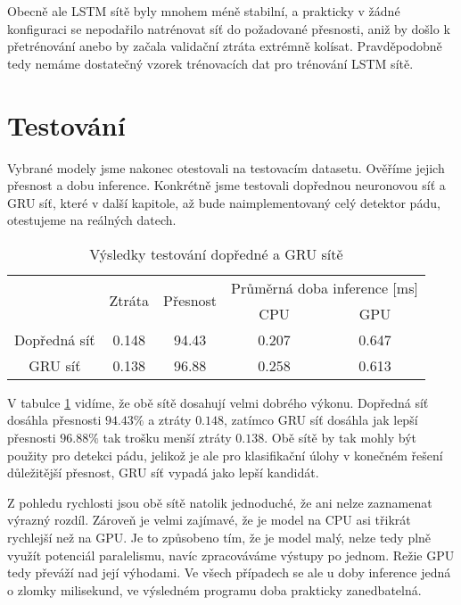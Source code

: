 Obecně ale LSTM sítě byly mnohem méně stabilní, a prakticky v žádné konfiguraci
se nepodařilo natrénovat síť do požadované přesnosti, aniž by došlo k
přetrénování anebo by začala validační ztráta extrémně kolísat. Pravděpodobně
tedy nemáme dostatečný vzorek trénovacích dat pro trénování LSTM sítě.

\section{Testování}
\label{sec:testing}

Vybrané modely jsme nakonec otestovali na testovacím datasetu. Ověříme jejich
přesnost a dobu inference. Konkrétně jsme testovali dopřednou neuronovou síť a
GRU síť, které v další kapitole, až bude naimplementovaný celý detektor pádu,
otestujeme na reálných datech.

\begin{table}[htbp]
    \centering
    \caption{Výsledky testování dopředné a GRU sítě}
    \label{tab:testing}
    \begin{tabular}{|c|c|c|cc|}
        \hline
        \multirow{2}{*}{} & \multirow{2}{*}{Ztráta} & \multirow{2}{*}{Přesnost} & \multicolumn{2}{c|}{Průměrná doba inference [ms]}         \\ \cline{4-5}
                          &                         &                           & \multicolumn{1}{c|}{  CPU  }                      & GPU   \\ \hline
        Dopředná síť      & 0.148                   & 94.43                     & \multicolumn{1}{c|}{0.207}                        & 0.647 \\ \hline
        GRU síť           & 0.138                   & 96.88                     & \multicolumn{1}{c|}{0.258}                        & 0.613 \\ \hline
    \end{tabular}
\end{table}

V tabulce \ref{tab:testing} vidíme, že obě sítě dosahují velmi dobrého výkonu.
Dopředná síť dosáhla přesnosti $94.43\%$ a ztráty $0.148$, zatímco GRU síť
dosáhla jak lepší přesnosti $96.88\%$ tak trošku menší ztráty $0.138$. Obě sítě
by tak mohly být použity pro detekci pádu, jelikož je ale pro klasifikační
úlohy v konečném řešení důležitější přesnost, GRU síť vypadá jako lepší
kandidát.

Z pohledu rychlosti jsou obě sítě natolik jednoduché, že ani nelze zaznamenat
výrazný rozdíl. Zároveň je velmi zajímavé, že je model na CPU asi třikrát
rychlejší než na GPU. Je to způsobeno tím, že je model malý, nelze tedy plně
využít potenciál paralelismu, navíc zpracováváme výstupy po jednom. Režie GPU
tedy převáží nad její výhodami. Ve všech případech se ale u doby inference
jedná o zlomky milisekund, ve výsledném programu doba prakticky zanedbatelná.


